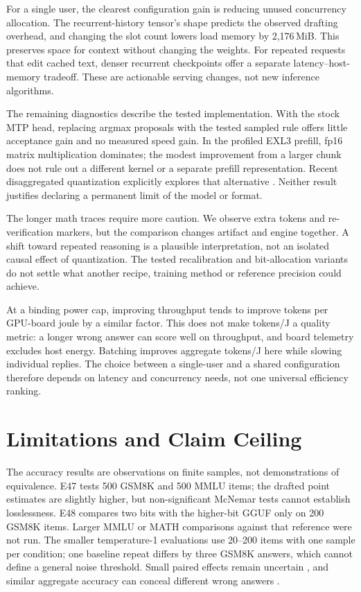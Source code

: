 \documentclass[11pt]{article}
\begin{document}
For a single user, the clearest configuration gain is reducing unused
concurrency allocation. The recurrent-history tensor's shape predicts the
observed drafting overhead, and changing the slot count lowers load memory
by 2,176\,MiB. This preserves space for context without changing the weights.
For repeated requests that edit cached text, denser recurrent checkpoints
offer a separate latency--host-memory tradeoff. These are actionable serving
changes, not new inference algorithms.

The remaining diagnostics describe the tested implementation. With the
stock MTP head, replacing argmax proposals with the tested sampled rule
offers little acceptance gain and no measured speed gain. In the profiled
EXL3 prefill, fp16 matrix multiplication dominates; the modest improvement
from a larger chunk does not rule out a different kernel or a separate
prefill representation. Recent disaggregated quantization explicitly
explores that alternative \citep{panferov2026disaggregated}. Neither result
justifies declaring a permanent limit of the model or format.

The longer math traces require more caution. We observe extra tokens and
re-verification markers, but the comparison changes artifact and engine
together. A shift toward repeated reasoning is a plausible interpretation,
not an isolated causal effect of quantization. The tested recalibration and
bit-allocation variants do not settle what another recipe, training method
or reference precision could achieve.

At a binding power cap, improving throughput tends to improve tokens per
GPU-board joule by a similar factor. This does not make tokens/J a quality
metric: a longer wrong answer can score well on throughput, and board
telemetry excludes host energy. Batching improves aggregate tokens/J here
while slowing individual replies. The choice between a single-user and a
shared configuration therefore depends on latency and concurrency needs,
not one universal efficiency ranking.

\section{Limitations and Claim Ceiling}
\label{sec:limits}

The accuracy results are observations on finite samples, not demonstrations
of equivalence. E47 tests 500 GSM8K and 500 MMLU items; the drafted point
estimates are slightly higher, but non-significant McNemar tests cannot
establish losslessness. E48 compares two bits with the higher-bit GGUF only
on 200 GSM8K items. Larger MMLU or MATH comparisons against that reference
were not run. The smaller temperature-1 evaluations use 20--200 items with
one sample per condition; one baseline repeat differs by three GSM8K
answers, which cannot define a general noise threshold. Small paired effects
remain uncertain \citep{hochlehnert2025sober,miller2024errorbars}, and similar
aggregate accuracy can conceal different wrong answers
\citep{dutta2024accuracy}.
\end{document}
